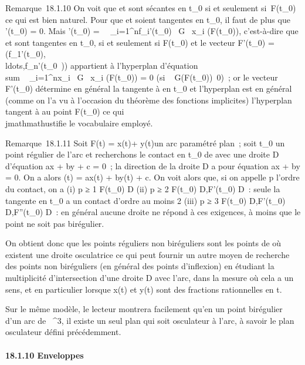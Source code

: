 \documentclass[]{article}
\begin{document}
Remarque~18.1.10 On voit que \Gamma et \Sigma sont sécantes en t_0 si et
seulement si~F(t_0) \in \Sigma ce qui est bien naturel. Pour que \Gamma et
\Sigma soient tangentes en t_0, il faut de plus que \phi'(t_0)
= 0. Mais \phi'(t_0) =\
\sum ~
_i=1^nf_i'(t_0) \partial~G
\over \partial~x_i (F(t_0)), c'est-à-dire que
\Gamma et \Sigma sont tangentes en t_0, si et seulement si
F(t_0) \in \Sigma et le vecteur F'(t_0) =
(f_1'(t_0),\\ldots,f_n'(t_0~))
appartient à l'hyperplan \Pi d'équation
\\sum ~
_i=1^nx_i \partial~G \over
\partial~x_i (F(t_0)) = 0 (si
\mathrmgrad~
G(F(t_0))\neq~0)~; or le vecteur
F'(t_0) détermine en général la tangente à \Gamma en t_0 et
l'hyperplan \Pi est en général (comme on l'a vu à l'occasion du théorème
des fonctions implicites) l'hyperplan tangent à \Sigma au point
F(t_0) ce qui \\jmathmathustifie le vocabulaire employé.

Remarque~18.1.11 Soit F(t) = x(t)\vec\imath +
y(t) un arc paramétré plan~; soit t_0
un point régulier de l'arc et recherchons le contact en t_0 de
\Gamma avec une droite D d'équation ax + by + c = 0~; la direction
\vecD de la droite D a pour équation ax + by = 0. On
a alors \phi(t) = ax(t) + by(t) + c. On voit alors que, si on appelle p
l'ordre du contact, on a (i) p ≥ 1 \Leftrightarrow
F(t_0) \in D (ii) p ≥ 2 \Leftrightarrow
F(t_0) \in D,F'(t_0) \in\vec D~: seule
la tangente en t_0 a un contact d'ordre au moins 2 (iii) p ≥ 3
\Leftrightarrow F(t_0) \in D,F'(t_0)
\in\vec D,F''(t_0) \in\vec
D~: en général aucune droite ne répond à ces exigences, à moins que le
point ne soit pas birégulier.

On obtient donc que les points réguliers non biréguliers sont les points
de \Gamma où existent une droite osculatrice ce qui peut fournir un autre
moyen de recherche des points non biréguliers (en général des points
d'inflexion) en étudiant la multiplicité d'intersection d'une droite D
avec l'arc, dans la mesure où cela a un sens, et en particulier lorsque
x(t) et y(t) sont des fractions rationnelles en t.

Sur le même modèle, le lecteur montrera facilement qu'en un point
birégulier d'un arc de \mathbb{R}~^3, il existe un seul plan qui soit
osculateur à l'arc, à savoir le plan osculateur défini précédemment.

\paragraph{18.1.10 Enveloppes}
\end{document}
